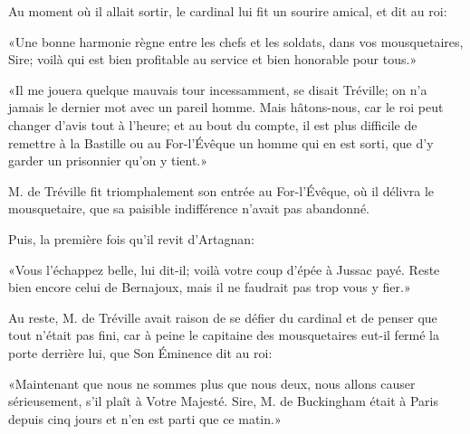 Au moment où il allait sortir, le cardinal lui fit un sourire amical, et dit au roi: 

«Une bonne harmonie règne entre les chefs et les soldats, dans vos mousquetaires, Sire; voilà qui est bien profitable au service et bien honorable pour tous.» 

«Il me jouera quelque mauvais tour incessamment, se disait Tréville; on n'a jamais le dernier mot avec un pareil homme. Mais hâtons-nous, car le roi peut changer d'avis tout à l'heure; et au bout du compte, il est plus difficile de remettre à la Bastille ou au For-l'Évêque un homme qui en est sorti, que d'y garder un prisonnier qu'on y tient.» 

M. de Tréville fit triomphalement son entrée au For-l'Évêque, où il délivra le mousquetaire, que sa paisible indifférence n'avait pas abandonné. 

Puis, la première fois qu'il revit d'Artagnan: 

«Vous l'échappez belle, lui dit-il; voilà votre coup d'épée à Jussac payé. Reste bien encore celui de Bernajoux, mais il ne faudrait pas trop vous y fier.» 

Au reste, M. de Tréville avait raison de se défier du cardinal et de penser que tout n'était pas fini, car à peine le capitaine des mousquetaires eut-il fermé la porte derrière lui, que Son Éminence dit au roi: 

«Maintenant que nous ne sommes plus que nous deux, nous allons causer sérieusement, s'il plaît à Votre Majesté. Sire, M. de Buckingham était à Paris depuis cinq jours et n'en est parti que ce matin.» 